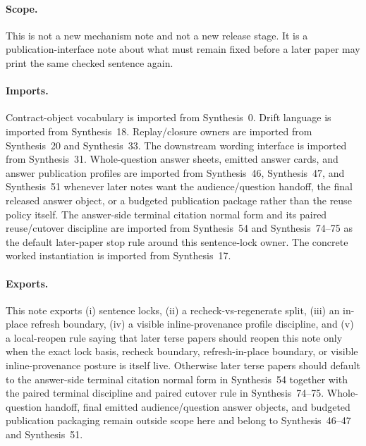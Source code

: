 \documentclass[11pt]{article}
\begin{document}
\paragraph{Scope.}
This is not a new mechanism note and not a new release stage.
It is a publication-interface note about what must remain fixed before a later paper may print the same checked sentence again.

\paragraph{Imports.}
Contract-object vocabulary is imported from Synthesis~0.\cite{series:contractobjects}
Drift language is imported from Synthesis~18.\cite{series:planstateequiv}
Replay/closure owners are imported from Synthesis~20 and Synthesis~33.\cite{series:auditorreplay,series:releaseclosure}
The downstream wording interface is imported from Synthesis~31.\cite{series:downstreamnormalforms}
Whole-question answer sheets, emitted answer cards, and answer publication profiles are imported from Synthesis~46, Synthesis~47, and Synthesis~51 whenever later notes want the audience/question handoff, the final released answer object, or a budgeted publication package rather than the reuse policy itself.\cite{series:challengeanswersheets,series:challengeanswercards,series:challengeanswerpublicationprofiles}
The answer-side terminal citation normal form and its paired reuse/cutover discipline are imported from Synthesis~54 and Synthesis~74--75 as the default later-paper stop rule around this sentence-lock owner.\cite{series:challengeanswerreviewmenus,series:pairedterminalcitationdiscipline,series:pairedterminalcutoverrules}
The concrete worked instantiation is imported from Synthesis~17.\cite{series:workedexample}

\paragraph{Exports.}
This note exports (i) sentence locks, (ii) a recheck-vs-regenerate split, (iii) an in-place refresh boundary, (iv) a visible inline-provenance profile discipline, and (v) a local-reopen rule saying that later terse papers should reopen this note only when the exact lock basis, recheck boundary, refresh-in-place boundary, or visible inline-provenance posture is itself live. Otherwise later terse papers should default to the answer-side terminal citation normal form in Synthesis~54 together with the paired terminal discipline and paired cutover rule in Synthesis~74--75. Whole-question handoff, final emitted audience/question answer objects, and budgeted publication packaging remain outside scope here and belong to Synthesis~46--47 and Synthesis~51.\cite{series:challengeanswersheets,series:challengeanswercards,series:challengeanswerpublicationprofiles,series:challengeanswerreviewmenus,series:pairedterminalcitationdiscipline,series:pairedterminalcutoverrules}
\end{document}
